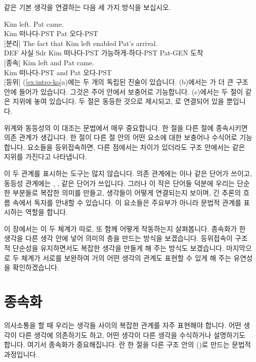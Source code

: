 같은 기본 생각을 연결하는 다음 세 가지 방식을 보십시오.

\ea \label{ex:intro-ko}
    \ea \gll Kim left. Pat came.\\
        Kim 떠나다-PST Pat 오다-PST\\
    \glt {} [분리]
    \ex \gll The fact {\ob}that Kim left{\cb} enabled Pat's arrival.\\
        DEF 사실 Sdr Kim 떠나다-PST 가능하게-하다-PST Pat-GEN 도착\\
    \glt {} [종속]
    \ex \gll Kim left and Pat came.\\
        Kim 떠나다-PST and Pat 오다-PST\\
    \glt {} [등위]
    \z
\z
(\ref{ex:intro-ko}a)에는 두 개의 독립된 진술이 있습니다. (b)에서는 가 더 큰 구조 안에 들어가 있습니다. 그것은 주어 안에서 보충어로 기능합니다. (c)에서는 두 절이 같은 지위에 놓여 있습니다. 두 절은 동등한 것으로 제시되고, 로 연결되어 있을 뿐입니다.

위계와 동등성의 이 대조는 문법에서 매우 중요합니다. 한 절을 다른 절에 종속시키면 의존 관계가 생깁니다. 한 절이 다른 절 안의 어떤 요소에 대한 보충어나 수식어로 기능합니다. 요소들을 등위접속하면, 다른 점에서는 차이가 있더라도 구조 안에서는 같은 지위를 가진다고 나타냅니다.

이 두 관계를 표시하는 도구는 많지 않습니다. 의존 관계에는 이나  같은 단어가 쓰이고, 동등성 관계에는 , ,  같은 단어가 쓰입니다. 그러나 이 작은 단어들 덕분에 우리는 단순한 부분들로 복잡한 의미를 만들고, 생각들이 어떻게 연결되는지 보이며, 긴 추론의 흐름 속에서 독자를 안내할 수 있습니다. 이 요소들은 주요부가 아니라 문법적 관계를 표시하는 역할을 합니다.

이 장에서는 이 두 체계가 따로, 또 함께 어떻게 작동하는지 살펴봅니다. 종속화가 한 생각을 다른 생각 안에 넣어 의미의 층을 만드는 방식을 보겠습니다. 등위접속이 구조적 단순성을 유지하면서도 복잡한 생각을 만들게 해 주는 방식도 보겠습니다. 마지막으로 두 체계가 서로를 보완하여 거의 어떤 생각의 관계도 표현할 수 있게 해 주는 유연성을 확인하겠습니다.

\section{종속화}\label{sec:subordination-ko}

의사소통을 할 때 우리는 생각들 사이의 복잡한 관계를 자주 표현해야 합니다. 어떤 생각이 다른 생각에 의존하기도 하고, 어떤 생각이 다른 생각을 수식하거나 설명하기도 합니다. 여기서 종속화가 중요해집니다. 란 한 절을 다른 구조 안의 ()로 만드는 문법적 과정입니다.

